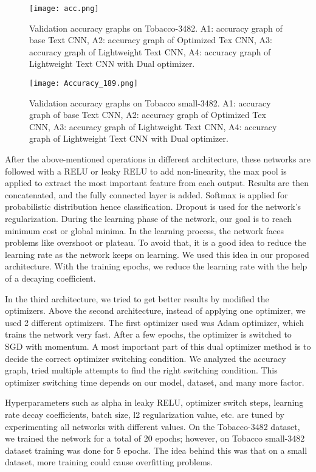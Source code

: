 \documentclass[conference]{IEEEtran}
\begin{document}
\begin{figure*}[htbp]
\centerline{\texttt{[image: acc.png]}}
\caption{Validation accuracy graphs on Tobacco-3482. A1: accuracy graph of base Text CNN, A2: accuracy graph of Optimized Tex CNN, A3: accuracy graph of Lightweight Text CNN, A4: accuracy graph of Lightweight Text CNN with Dual optimizer. }
\label{fig}
\end{figure*}

\begin{figure*}[htbp]
\centerline{\texttt{[image: Accuracy\_189.png]}}
\caption{Validation accuracy graphs on Tobacco small-3482. A1: accuracy graph of base Text CNN, A2: accuracy graph of Optimized Tex CNN, A3: accuracy graph of Lightweight Text CNN, A4: accuracy graph of Lightweight Text CNN with Dual optimizer. }
\label{fig}
\end{figure*}

After the above-mentioned operations in different architecture, these networks are followed with a RELU or leaky RELU to add non-linearity, the max pool is applied to extract the most important feature from each output. Results are then concatenated, and the fully connected layer is added. Softmax is applied for probabilistic distribution hence classification. Dropout is used for the network's regularization. During the learning phase of the network, our goal is to reach minimum cost or global minima. In the learning process, the network faces problems like overshoot or plateau. To avoid that, it is a good idea to reduce the learning rate as the network keeps on learning. We used this idea in our proposed architecture. With the training epochs, we reduce the learning rate with the help of a decaying coefficient.

In the third architecture, we tried to get better results by modified the optimizers. Above the second architecture, instead of applying one optimizer, we used 2 different optimizers. The first optimizer used was Adam optimizer, which trains the network very fast. After a few epochs, the optimizer is switched to SGD with momentum. A most important part of this dual optimizer method is to decide the correct optimizer switching condition. We analyzed the accuracy graph, tried multiple attempts to find the right switching condition. This optimizer switching time depends on our model, dataset, and many more factor.

Hyperparameters such as alpha in leaky RELU, optimizer switch steps, learning rate decay coefficients, batch size, l2 regularization value, etc. are tuned by experimenting all networks with different values.
On the Tobacco-3482 dataset, we trained the network for a total of 20 epochs; however, on Tobacco small-3482 dataset training was done for 5 epochs. The idea behind this was that on a small dataset, more training could cause overfitting problems.
\end{document}
